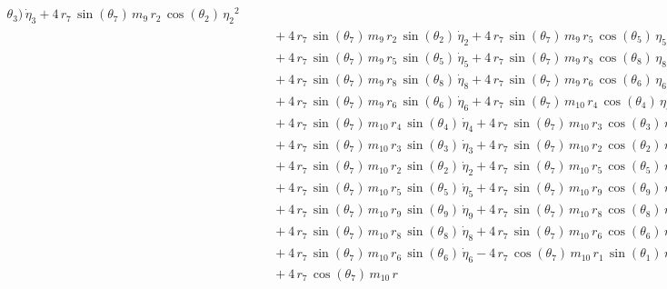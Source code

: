 \begin{eqnarray*}
{\theta_{3}})\,{\dot{\eta}_{3}} + 4\,r_{7}\,\sin({\theta_{7}})\,m_{9}
\,r_{2}\,\cos({\theta_{2}})\,{{\eta_{2}}}^2 \\ &&\quad\mbox{} + 4\,r_{
7}\,\sin({\theta_{7}})\,m_{9}\,r_{2}\,\sin({\theta_{2}})\,{\dot{\eta}
_{2}} + 4\,r_{7}\,\sin({\theta_{7}})\,m_{9}\,r_{5}\,\cos({\theta_{5}})
\,{{\eta_{5}}}^2 \\ &&\quad\mbox{} + 4\,r_{7}\,\sin({\theta_{7}})\,m_{
9}\,r_{5}\,\sin({\theta_{5}})\,{\dot{\eta}_{5}} + 4\,r_{7}\,\sin({
\theta_{7}})\,m_{9}\,r_{8}\,\cos({\theta_{8}})\,{{\eta_{8}}}^2
 \\ &&\quad\mbox{} + 4\,r_{7}\,\sin({\theta_{7}})\,m_{9}\,r_{8}\,\sin(
{\theta_{8}})\,{\dot{\eta}_{8}} + 4\,r_{7}\,\sin({\theta_{7}})\,m_{9}
\,r_{6}\,\cos({\theta_{6}})\,{{\eta_{6}}}^2 \\ &&\quad\mbox{} + 4\,r_{
7}\,\sin({\theta_{7}})\,m_{9}\,r_{6}\,\sin({\theta_{6}})\,{\dot{\eta}
_{6}} + 4\,r_{7}\,\sin({\theta_{7}})\,m_{10}\,r_{4}\,\cos({\theta_{4}}
)\,{{\eta_{4}}}^2 \\ &&\quad\mbox{} + 4\,r_{7}\,\sin({\theta_{7}})\,m
_{10}\,r_{4}\,\sin({\theta_{4}})\,{\dot{\eta}_{4}} + 4\,r_{7}\,\sin({
\theta_{7}})\,m_{10}\,r_{3}\,\cos({\theta_{3}})\,{{\eta_{3}}}^2
 \\ &&\quad\mbox{} + 4\,r_{7}\,\sin({\theta_{7}})\,m_{10}\,r_{3}\,\sin
({\theta_{3}})\,{\dot{\eta}_{3}} + 4\,r_{7}\,\sin({\theta_{7}})\,m_{10
}\,r_{2}\,\cos({\theta_{2}})\,{{\eta_{2}}}^2 \\ &&\quad\mbox{} + 4\,r
_{7}\,\sin({\theta_{7}})\,m_{10}\,r_{2}\,\sin({\theta_{2}})\,{
\dot{\eta}_{2}} + 4\,r_{7}\,\sin({\theta_{7}})\,m_{10}\,r_{5}\,\cos({
\theta_{5}})\,{{\eta_{5}}}^2 \\ &&\quad\mbox{} + 4\,r_{7}\,\sin({
\theta_{7}})\,m_{10}\,r_{5}\,\sin({\theta_{5}})\,{\dot{\eta}_{5}} + 4
\,r_{7}\,\sin({\theta_{7}})\,m_{10}\,r_{9}\,\cos({\theta_{9}})\,{{\eta
_{9}}}^2 \\ &&\quad\mbox{} + 4\,r_{7}\,\sin({\theta_{7}})\,m_{10}\,r_{
9}\,\sin({\theta_{9}})\,{\dot{\eta}_{9}} + 4\,r_{7}\,\sin({\theta_{7}}
)\,m_{10}\,r_{8}\,\cos({\theta_{8}})\,{{\eta_{8}}}^2 \\ &&\quad\mbox{}
 + 4\,r_{7}\,\sin({\theta_{7}})\,m_{10}\,r_{8}\,\sin({\theta_{8}})\,{
\dot{\eta}_{8}} + 4\,r_{7}\,\sin({\theta_{7}})\,m_{10}\,r_{6}\,\cos({
\theta_{6}})\,{{\eta_{6}}}^2 \\ &&\quad\mbox{} + 4\,r_{7}\,\sin({
\theta_{7}})\,m_{10}\,r_{6}\,\sin({\theta_{6}})\,{\dot{\eta}_{6}} - 4
\,r_{7}\,\cos({\theta_{7}})\,m_{10}\,r_{1}\,\sin({\theta_{1}})\,{{\eta
_{1}}}^2 \\ &&\quad\mbox{} + 4\,r_{7}\,\cos({\theta_{7}})\,m_{10}\,r_{
}
\end{eqnarray*}
